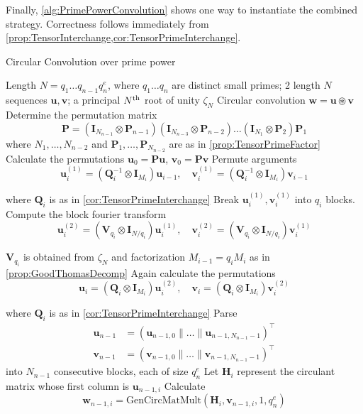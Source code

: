Finally, \cref{alg:PrimePowerConvolution} shows one way to instantiate the combined strategy. Correctness follows immediately from \cref{prop:TensorInterchange,cor:TensorPrimeInterchange}.
\begin{algorithm}[h]
    \caption{Circular Convolution over prime power} \label{alg:PrimePowerConvolution}
    \begin{algorithmic}[1]
        \Require Length \(N = q_1 \ldots q_{n-1} q_n^e\), where \(q_1\ldots q_n\) are distinct small primes; 2 length \(N\) sequences \(\bm{u}, \bm{v}\); a principal \(N\textsuperscript{th}\) root of unity \(\zeta_N\)
        \Ensure Circular convolution \(\bm{w} = \bm{u} \circledast \bm{v}\)
        \State Determine the permutation matrix
        \[\bm{P} = \left(\bm{I}_{N_{n-1}} \otimes \bm{P}_{n-1}\right) \left(\bm{I}_{N_{n-3}} \otimes \bm{P}_{n-2}\right) \ldots \left(\bm{I}_{N_1} \otimes \bm{P}_2\right) \bm{P}_1\]
        where \(N_1, \ldots , N_{n-2}\) and \(\bm{P}_1, \ldots , \bm{P}_{N_{n-2}}\) are as in \cref{prop:TensorPrimeFactor}
        \State Calculate the permutations \(\bm{u}_0 = \bm{P} \bm{u}\), \(\bm{v}_0 = \bm{P} \bm{v}\)
            \State Permute arguments 
            \[\bm{u}_i^{(1)} = \left(\bm{Q}_i^{-1} \otimes \bm{I}_{M_i}\right) \bm{u}_{i-1}, \quad \bm{v}_i^{(1)} = \left(\bm{Q}_i^{-1} \otimes \bm{I}_{M_i}\right) \bm{v}_{i-1}\]

            where \(\bm{Q}_i\) is as in \cref{cor:TensorPrimeInterchange}
            \State Break \(\bm{u}_i^{(1)}, \bm{v}_i^{(1)}\) into \(q_i\) blocks. Compute the block fourier transform
            \[\bm{u}_i^{(2)} = \left(\bm{V}_{q_i} \otimes \bm{I}_{N / q_i}\right) \bm{u}_i^{(1)}, \quad \bm{v}_i^{(2)} = \left(\bm{V}_{q_i} \otimes \bm{I}_{N / q_i}\right) \bm{v}_i^{(1)}\]

            \(\bm{V}_{q_i}\) is obtained from \(\zeta_N\) and factorization \(M_{i-1} = q_i M_i\) as in \cref{prop:GoodThomasDecomp}
            \State Again calculate the permutations
            \[\bm{u}_i = \left(\bm{Q}_i \otimes \bm{I}_{M_i}\right) \bm{u}_i^{(2)}, \quad \bm{v}_i = \left(\bm{Q}_i \otimes \bm{I}_{M_i}\right) \bm{v}_i^{(2)}\]

            where \(\bm{Q}_i\) is as in \cref{cor:TensorPrimeInterchange}
        \EndFor
        \State Parse
        \begin{align*}
            \bm{u}_{n-1} &= (\bm{u}_{n-1, 0} \parallel \ldots \parallel \bm{u}_{n-1, N_{n-1}-1})^{\top} \\
            \bm{v}_{n-1} &= (\bm{v}_{n-1, 0} \parallel \ldots \parallel \bm{v}_{n-1, N_{n-1}-1})^{\top}
        \end{align*}
        into \(N_{n-1}\) consecutive blocks, each of size \(q_n^e\)
            \State Let \(\bm{H}_i\) represent the circulant matrix whose first column is \(\bm{u}_{n-1, i}\)
            \State Calculate
            \[\bm{w}_{n-1, i} = \text{GenCircMatMult}(\bm{H}_i, \bm{v}_{n-1, i}, 1, q_n^e)\]


\end{algorithmic}
\end{algorithm}
